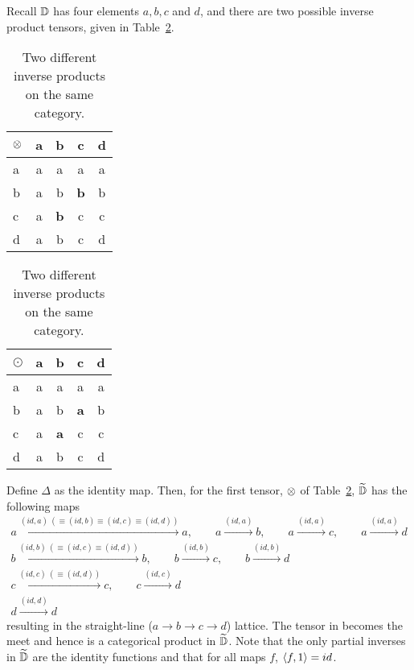 Recall $\mathbb{D}$ has four elements $a,b,c$ and $d$, and there are two possible inverse product tensors,
given in Table~\ref{tab:two_different_inverse_products}.
\begin{table}[h!]
  \begin{center}
  \begin{tabular}{|l||c|c|c|c|}
    \hline
    $\otimes$&a&b&c&d\\ \hline \hline
    a&a&a&a&a\\ \hline
    b&a&b&\textbf{b}&b\\ \hline
    c&a&\textbf{b}&c&c \\ \hline
    d&a&b&c&d \\ \hline
  \end{tabular}
  \qquad
  \begin{tabular}{|l||c|c|c|c|} \hline
    $\odot$&a&b&c&d\\ \hline \hline
    a&a&a&a&a\\ \hline
    b&a&b&\textbf{a}&b\\ \hline
    c&a&\textbf{a}&c&c \\ \hline
    d&a&b&c&d \\ \hline
  \end{tabular}
  \end{center}
  \caption{Two different inverse products on the same category.}
  \label{tab:two_different_inverse_products}
\end{table}


Define $\Delta$ as the identity map. Then, for the first tensor, $\otimes$ of
Table~\ref{tab:two_different_inverse_products}, $\widetilde{\mathbb{D}}$ has the following
maps
\begin{align*}
  a \xrightarrow{(id,a)\ (\equiv (id, b) \equiv (id,c) \equiv (id,d))} a, \qquad a
    \xrightarrow{(id,a)} b, \qquad a \xrightarrow{(id, a)} c , \qquad a \xrightarrow{(id, a)} d \\
  b \xrightarrow{(id,b) \ (\equiv (id, c) \equiv (id, d))} b , \qquad b \xrightarrow{(id,b)} c,
    \qquad b \xrightarrow{(id,b)} d\\
  c \xrightarrow{(id, c) \ (\equiv (id, d))} c ,   \qquad c \xrightarrow{(id,c)} d\\
  d \xrightarrow{(id,d)} d
\end{align*}
resulting in the straight-line ($a \to b \to c \to d$) lattice. The tensor in \D becomes the meet
and hence is a categorical product in $\widetilde{\mathbb{D}}$. Note that the only partial inverses in
$\widetilde{\mathbb{D}}$ are the identity functions and that for all maps $f$, $\langle f,1\rangle = id$.

